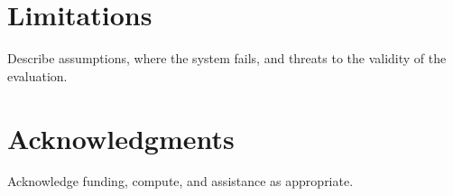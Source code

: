 \documentclass[10pt,twocolumn]{article}
\begin{document}
\twocolumn[{%
\begin{@twocolumnfalse}
  \uiucclassictitle
\end{@twocolumnfalse}
}]






\section*{Limitations}
Describe assumptions, where the system fails, and threats to the validity of the evaluation.

\section*{Acknowledgments}
Acknowledge funding, compute, and assistance as appropriate.




\appendix

\end{document}
